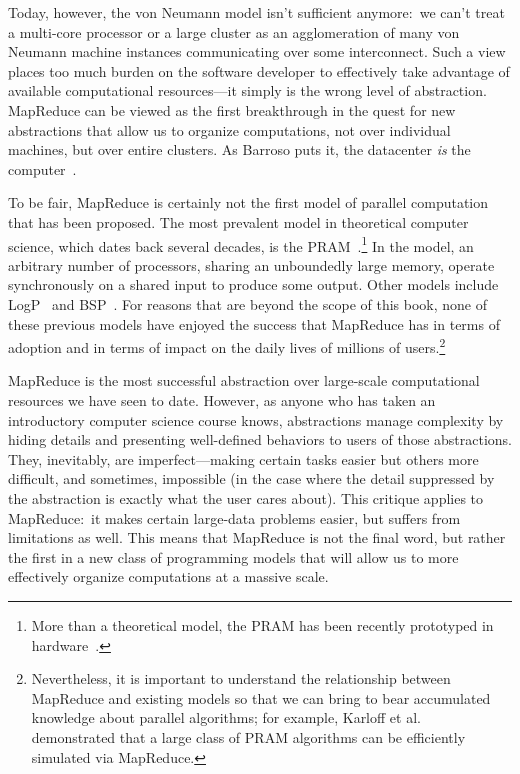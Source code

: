 Today, however, the von Neumann model isn't sufficient anymore:\ we
can't treat a multi-core processor or a large cluster as an
agglomeration of many von Neumann machine instances communicating over
some interconnect.  Such a view places too much burden on the software
developer to effectively take advantage of available computational
resources---it simply is the wrong level of abstraction.  MapReduce
can be viewed as the first breakthrough in the quest for new
abstractions that allow us to organize computations, not over
individual machines, but over entire clusters.  As Barroso puts it,
the datacenter {\it is} the
computer~\cite{Barroso_Holzle_2009,Patterson_CACM2008}.

To be fair, MapReduce is certainly not the first model of parallel
computation that has been proposed.  The most prevalent model in
theoretical computer science, which dates back several decades, is the
PRAM~\cite{JaJa_1992,Grama_etal_2003}.\footnote{More than a
  theoretical model, the PRAM has been recently prototyped in
  hardware~\cite{Wen_Vishkin_2008}.} In the model, an arbitrary number
of processors, sharing an unboundedly large memory, operate
synchronously on a shared input to produce some output.  Other models
include LogP~\cite{Culler_etal_1993} and BSP~\cite{Valiant_CACM1990}.
For reasons that are beyond the scope of this book, none of these
previous models have enjoyed the success that MapReduce has in terms
of adoption and in terms of impact on the daily lives of millions of
users.\footnote{Nevertheless, it is important to understand the
  relationship between MapReduce and existing models so that we can
  bring to bear accumulated knowledge about parallel algorithms; for
  example, Karloff et al.~\cite{Karloff_etal_2010} demonstrated that a
  large class of PRAM algorithms can be efficiently simulated via
  MapReduce.}

MapReduce is the most successful abstraction over large-scale
computational resources we have seen to date.  However, as anyone who
has taken an introductory computer science course knows, abstractions
manage complexity by hiding details and presenting well-defined
behaviors to users of those abstractions.  They, inevitably, are
imperfect---making certain tasks easier but others more difficult, and
sometimes, impossible (in the case where the detail suppressed by the
abstraction is exactly what the user cares about).  This critique
applies to MapReduce:\ it makes certain large-data problems easier,
but suffers from limitations as well.  This means that MapReduce is
not the final word, but rather the first in a new class of programming
models that will allow us to more effectively organize computations at
a massive scale.

